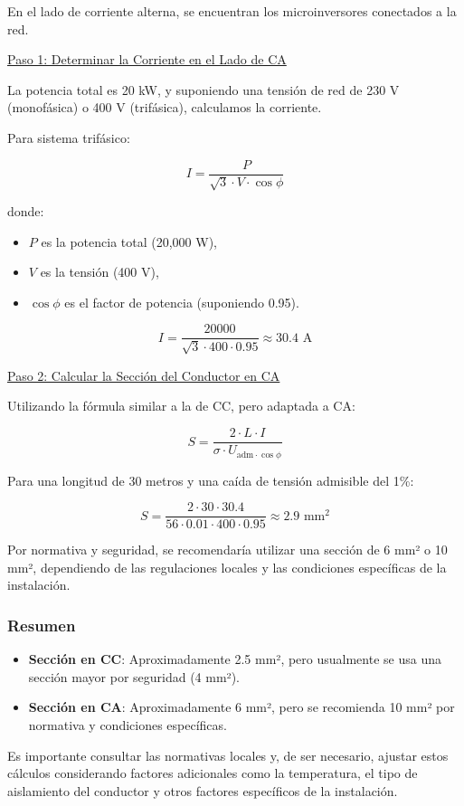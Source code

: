 \documentclass{article}
\newcommand{\path}{../../assets/settings}
\begin{document}
En el lado de corriente alterna, se encuentran los microinversores conectados a la red.

\uline{Paso 1: Determinar la Corriente en el Lado de CA}

La potencia total es 20 kW, y suponiendo una tensión de red de 230 V (monofásica) o 400 V (trifásica), calculamos la corriente.

Para sistema trifásico:

$$
I = \frac{P}{\sqrt{3} \cdot V \cdot \cos\phi}
$$

donde:
\begin{itemize}
    \item \(P\) es la potencia total (20,000 W),
    \item \(V\) es la tensión (400 V),
    \item \(\cos\phi\) es el factor de potencia (suponiendo 0.95).
\end{itemize}

$$
I = \frac{20000}{\sqrt{3} \cdot 400 \cdot 0.95} \approx 30.4 \text{ A}
$$

\uline{Paso 2: Calcular la Sección del Conductor en CA}

Utilizando la fórmula similar a la de CC, pero adaptada a CA:

$$
S = \frac{2 \cdot L \cdot I}{\sigma \cdot U_{\text{adm} \cdot \cos\phi}}
$$

Para una longitud de 30 metros y una caída de tensión admisible del 1\%:

$$
S = \frac{2 \cdot 30 \cdot 30.4}{56 \cdot 0.01 \cdot 400 \cdot 0.95} \approx 2.9 \text{ mm}^2
$$

Por normativa y seguridad, se recomendaría utilizar una sección de 6 mm² o 10 mm², dependiendo de las regulaciones locales y las condiciones específicas de la instalación.

\subsubsection{Resumen}

\begin{itemize}
    \item \textbf{Sección en CC}: Aproximadamente 2.5 mm², pero usualmente se usa una sección mayor por seguridad (4 mm²).
    \item \textbf{Sección en CA}: Aproximadamente 6 mm², pero se recomienda 10 mm² por normativa y condiciones específicas.
\end{itemize}

Es importante consultar las normativas locales y, de ser necesario, ajustar estos cálculos considerando factores adicionales como la temperatura, el tipo de aislamiento del conductor y otros factores específicos de la instalación.


\ifdefined{} %
\else


\fi
\end{document}

